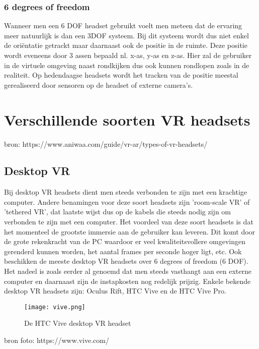 \subsubsection{6 degrees of freedom}
Wanneer men een 6 DOF headset gebruikt voelt men meteen dat de ervaring meer natuurlijk is dan een 3DOF systeem. Bij dit systeem wordt dus niet enkel de oriëntatie getrackt maar daarnaast ook de positie in de ruimte. Deze positie wordt eveneens door 3 assen bepaald nl. x-as, y-as en z-as. Hier zal de gebruiker in de virtuele omgeving naast rondkijken dus ook kunnen rondlopen zoals in de realiteit. Op hedendaagse headsets wordt het tracken van de positie meestal gerealiseerd door sensoren op de headset of externe camera's.
\pagebreak

\section{Verschillende soorten VR headsets}

bron: https://www.aniwaa.com/guide/vr-ar/types-of-vr-headsets/

\subsection{Desktop VR}
Bij desktop VR headsets dient men steeds verbonden te zijn met een krachtige computer. Andere benamingen voor deze soort headsets zijn 'room-scale VR' of 'tethered VR', dat laatste wijst dus op de kabels die steeds nodig zijn om verbonden te zijn met een computer. Het voordeel van deze soort headsets is dat het momenteel de grootste immersie aan de gebruiker kan leveren. Dit komt door de grote rekenkracht van de PC waardoor er veel kwaliteitsvollere omgevingen gerenderd kunnen worden, het aantal frames per seconde hoger ligt, etc. Ook beschikken de meeste desktop VR headsets over 6 degrees of freedom (6 DOF). Het nadeel is zoals eerder al genoemd dat men steeds vasthangt aan een externe computer en daarnaast zijn de instapkosten nog redelijk prijzig. Enkele bekende desktop VR headsets zijn: Oculus Rift, HTC Vive en de HTC Vive Pro.

\begin{figure}[h]
    \centering
    \texttt{[image: vive.png]}
    \caption{De HTC Vive desktop VR headset}
\end{figure}
bron foto: https://www.vive.com/

